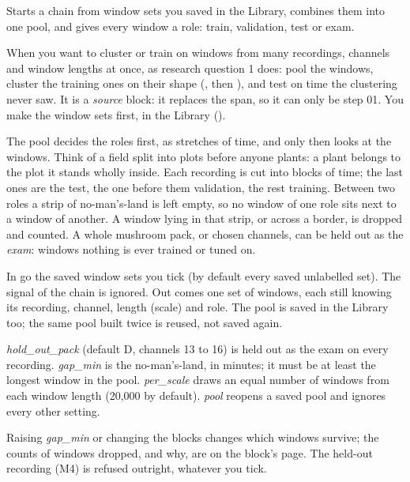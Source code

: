 Starts a chain from window sets you saved in the Library, combines them into one pool, and
gives every window a role: train, validation, test or exam.

When you want to cluster or train on windows from many recordings, channels and window
lengths at once, as research question 1 does: pool the windows, cluster the training ones on
their shape (, then ),
and test on time the clustering never saw. It is a \emph{source} block: it replaces the
span, so it can only be step 01. You make the window sets first, in the Library
().

\begin{plainterms}
The pool decides the roles first, as stretches of time, and only then looks at the windows.
Think of a field split into plots before anyone plants: a plant belongs to the plot it
stands wholly inside. Each recording is cut into blocks of time; the last ones are the test,
the one before them validation, the rest training. Between two roles a strip of
no-man's-land is left empty, so no window of one role sits next to a window of another.
A window lying in that strip, or across a border, is dropped and counted. A whole mushroom
pack, or chosen channels, can be held out as the \emph{exam}: windows nothing is ever
trained or tuned on.
\end{plainterms}

In go the saved window sets you tick (by default every saved unlabelled set). The signal of
the chain is ignored. Out comes one set of windows, each still knowing its recording,
channel, length (scale) and role. The pool is saved in the Library too; the same pool built
twice is reused, not saved again.

\emph{hold\_out\_pack} (default D, channels 13 to 16) is held out as the exam on every
recording. \emph{gap\_min} is the no-man's-land, in minutes; it must be at least the
longest window in the pool. \emph{per\_scale} draws an equal number of windows from each
window length (20,000 by default). \emph{pool} reopens a saved pool and ignores every other
setting.

Raising \emph{gap\_min} or changing the blocks changes which windows survive; the counts of
windows dropped, and why, are on the block's page. The held-out recording (M4) is refused
outright, whatever you tick.
